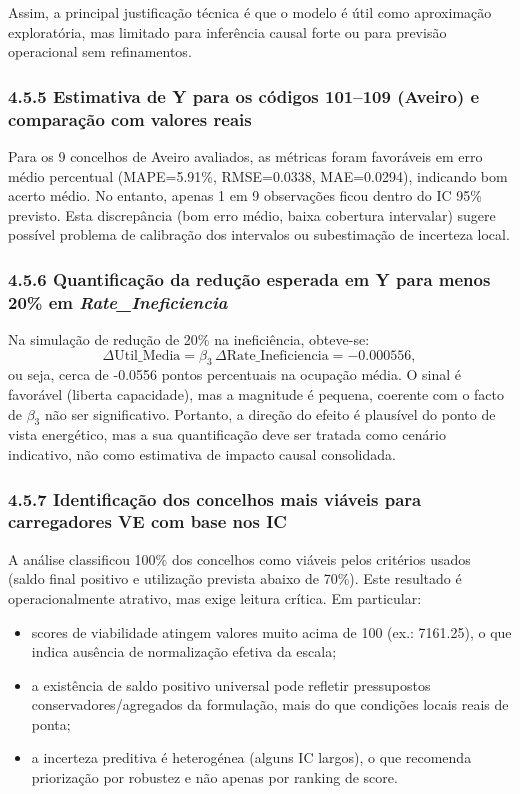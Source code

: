 Assim, a principal justificação técnica é que o modelo é útil como aproximação exploratória, mas limitado para inferência causal forte ou para previsão operacional sem refinamentos.

\subsubsection{4.5.5 Estimativa de Y para os códigos 101--109 (Aveiro) e comparação com valores reais}

Para os 9 concelhos de Aveiro avaliados, as métricas foram favoráveis em erro médio percentual (MAPE=5.91\%, RMSE=0.0338, MAE=0.0294), indicando bom acerto médio. No entanto, apenas 1 em 9 observações ficou dentro do IC 95\% previsto. Esta discrepância (bom erro médio, baixa cobertura intervalar) sugere possível problema de calibração dos intervalos ou subestimação de incerteza local.

\subsubsection{4.5.6 Quantificação da redução esperada em Y para menos 20\% em \textit{Rate\_Ineficiencia}}

Na simulação de redução de 20\% na ineficiência, obteve-se:
\[
\Delta\text{Util\_Media} = \beta_3\,\Delta\text{Rate\_Ineficiencia} = -0.000556,
\]
ou seja, cerca de -0.0556 pontos percentuais na ocupação média. O sinal é favorável (liberta capacidade), mas a magnitude é pequena, coerente com o facto de \(\beta_3\) não ser significativo. Portanto, a direção do efeito é plausível do ponto de vista energético, mas a sua quantificação deve ser tratada como cenário indicativo, não como estimativa de impacto causal consolidada.

\subsubsection{4.5.7 Identificação dos concelhos mais viáveis para carregadores VE com base nos IC}

A análise classificou 100\% dos concelhos como viáveis pelos critérios usados (saldo final positivo e utilização prevista abaixo de 70\%). Este resultado é operacionalmente atrativo, mas exige leitura crítica. Em particular:
\begin{itemize}
\item scores de viabilidade atingem valores muito acima de 100 (ex.: 7161.25), o que indica ausência de normalização efetiva da escala;
\item a existência de saldo positivo universal pode refletir pressupostos conservadores/agregados da formulação, mais do que condições locais reais de ponta;
\item a incerteza preditiva é heterogénea (alguns IC largos), o que recomenda priorização por robustez e não apenas por ranking de score.
\end{itemize}

